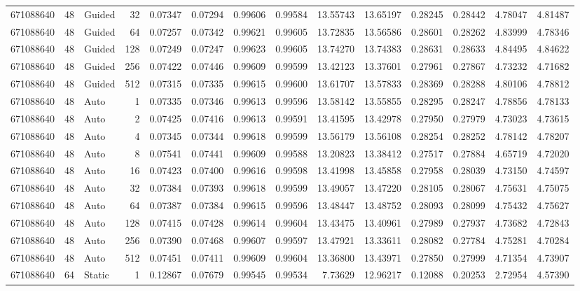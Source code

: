 \begin{tabular}{rrlrrrrrrrrrrr}
671088640 & 48 & Guided & 32 & 0.07347 & 0.07294 & 0.99606 & 0.99584 & 13.55743 & 13.65197 & 0.28245 & 0.28442 & 4.78047 & 4.81487 \\
671088640 & 48 & Guided & 64 & 0.07257 & 0.07342 & 0.99621 & 0.99605 & 13.72835 & 13.56586 & 0.28601 & 0.28262 & 4.83999 & 4.78346 \\
671088640 & 48 & Guided & 128 & 0.07249 & 0.07247 & 0.99623 & 0.99605 & 13.74270 & 13.74383 & 0.28631 & 0.28633 & 4.84495 & 4.84622 \\
671088640 & 48 & Guided & 256 & 0.07422 & 0.07446 & 0.99609 & 0.99599 & 13.42123 & 13.37601 & 0.27961 & 0.27867 & 4.73232 & 4.71682 \\
671088640 & 48 & Guided & 512 & 0.07315 & 0.07335 & 0.99615 & 0.99600 & 13.61707 & 13.57833 & 0.28369 & 0.28288 & 4.80106 & 4.78812 \\
671088640 & 48 & Auto & 1 & 0.07335 & 0.07346 & 0.99613 & 0.99596 & 13.58142 & 13.55855 & 0.28295 & 0.28247 & 4.78856 & 4.78133 \\
671088640 & 48 & Auto & 2 & 0.07425 & 0.07416 & 0.99613 & 0.99591 & 13.41595 & 13.42978 & 0.27950 & 0.27979 & 4.73023 & 4.73615 \\
671088640 & 48 & Auto & 4 & 0.07345 & 0.07344 & 0.99618 & 0.99599 & 13.56179 & 13.56108 & 0.28254 & 0.28252 & 4.78142 & 4.78207 \\
671088640 & 48 & Auto & 8 & 0.07541 & 0.07441 & 0.99609 & 0.99588 & 13.20823 & 13.38412 & 0.27517 & 0.27884 & 4.65719 & 4.72020 \\
671088640 & 48 & Auto & 16 & 0.07423 & 0.07400 & 0.99616 & 0.99598 & 13.41998 & 13.45858 & 0.27958 & 0.28039 & 4.73150 & 4.74597 \\
671088640 & 48 & Auto & 32 & 0.07384 & 0.07393 & 0.99618 & 0.99599 & 13.49057 & 13.47220 & 0.28105 & 0.28067 & 4.75631 & 4.75075 \\
671088640 & 48 & Auto & 64 & 0.07387 & 0.07384 & 0.99615 & 0.99596 & 13.48447 & 13.48752 & 0.28093 & 0.28099 & 4.75432 & 4.75627 \\
671088640 & 48 & Auto & 128 & 0.07415 & 0.07428 & 0.99614 & 0.99604 & 13.43475 & 13.40961 & 0.27989 & 0.27937 & 4.73682 & 4.72843 \\
671088640 & 48 & Auto & 256 & 0.07390 & 0.07468 & 0.99607 & 0.99597 & 13.47921 & 13.33611 & 0.28082 & 0.27784 & 4.75281 & 4.70284 \\
671088640 & 48 & Auto & 512 & 0.07451 & 0.07411 & 0.99609 & 0.99604 & 13.36800 & 13.43971 & 0.27850 & 0.27999 & 4.71354 & 4.73907 \\
671088640 & 64 & Static & 1 & 0.12867 & 0.07679 & 0.99545 & 0.99534 & 7.73629 & 12.96217 & 0.12088 & 0.20253 & 2.72954 & 4.57390 \\

\end{tabular}

